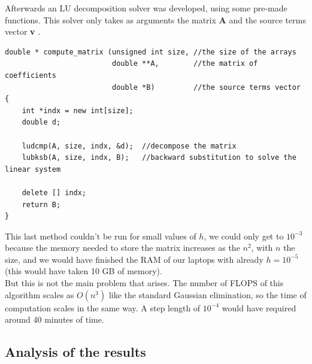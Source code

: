 \documentclass[10pt,a4paper,titlepage]{article}
\begin{document}
Afterwards an LU decomposition solver was developed, using some pre-made functions. This solver only takes as arguments the matrix {\bf A} and the source terms vector {\bf v} . 

\begin{lstlisting}[title={Solve LU decomposition}]
double * compute_matrix (unsigned int size, //the size of the arrays
                         double **A,        //the matrix of coefficients
                         double *B)         //the source terms vector
{
	int *indx = new int[size];
	double d;
    
	ludcmp(A, size, indx, &d);  //decompose the matrix
	lubksb(A, size, indx, B);   //backward substitution to solve the linear system
    
	delete [] indx;
	return B;
}
\end{lstlisting}

This last method couldn't be run for small values of $h$, we could only get to $10^{-3}$ because the memory needed to store the matrix increases as the $n^2$, with $n$ the size, and we would have finished the RAM of our laptops with already $h= 10^{-5}$ (this would have taken 10 GB of memory). \\
But this is not the main problem that arises. The number of FLOPS of this algorithm scales as $O(n^3)$ like the standard Gaussian elimination, so the time of computation scales in the same way. A step length of $10^{-4}$ would have required around 40 minutes of time.

\subsection*{Analysis of the results}
\end{document}
